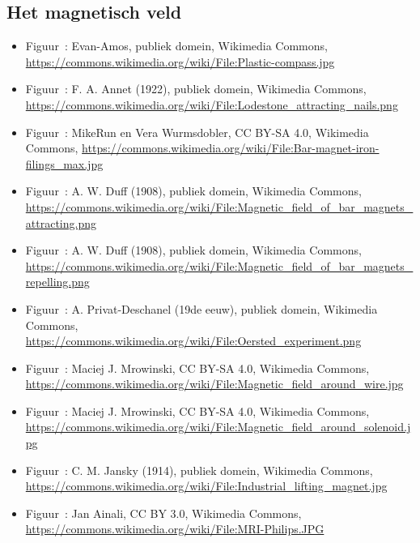 \documentclass{ximera}
\begin{document}
\subsection*{Het magnetisch veld}
\begin{itemize}
        \item Figuur~: Evan-Amos, publiek domein, Wikimedia Commons, \url{https://commons.wikimedia.org/wiki/File:Plastic-compass.jpg}
        \item Figuur~: F. A. Annet (1922), publiek domein, Wikimedia Commons, \url{https://commons.wikimedia.org/wiki/File:Lodestone_attracting_nails.png}
        \item Figuur~: MikeRun en Vera Wurmsdobler, CC BY-SA 4.0, Wikimedia Commons, \url{https://commons.wikimedia.org/wiki/File:Bar-magnet-iron-filings_max.jpg}
        \item Figuur~: A. W. Duff (1908), publiek domein, Wikimedia Commons, \url{https://commons.wikimedia.org/wiki/File:Magnetic_field_of_bar_magnets_attracting.png}
        \item Figuur~: A. W. Duff (1908), publiek domein, Wikimedia Commons, \url{https://commons.wikimedia.org/wiki/File:Magnetic_field_of_bar_magnets_repelling.png}
        \item Figuur~: A. Privat-Deschanel (19de eeuw), publiek domein, Wikimedia Commons, \url{https://commons.wikimedia.org/wiki/File:Oersted_experiment.png}
        \item Figuur~: Maciej J. Mrowinski, CC BY-SA 4.0, Wikimedia Commons, \url{https://commons.wikimedia.org/wiki/File:Magnetic_field_around_wire.jpg}
        \item Figuur~: Maciej J. Mrowinski, CC BY-SA 4.0, Wikimedia Commons, \url{https://commons.wikimedia.org/wiki/File:Magnetic_field_around_solenoid.jpg}
        \item Figuur~: C. M. Jansky (1914), publiek domein, Wikimedia Commons, \url{https://commons.wikimedia.org/wiki/File:Industrial_lifting_magnet.jpg}
        \item Figuur~: Jan Ainali, CC BY 3.0, Wikimedia Commons, \url{https://commons.wikimedia.org/wiki/File:MRI-Philips.JPG}
\end{itemize}
\end{document}
